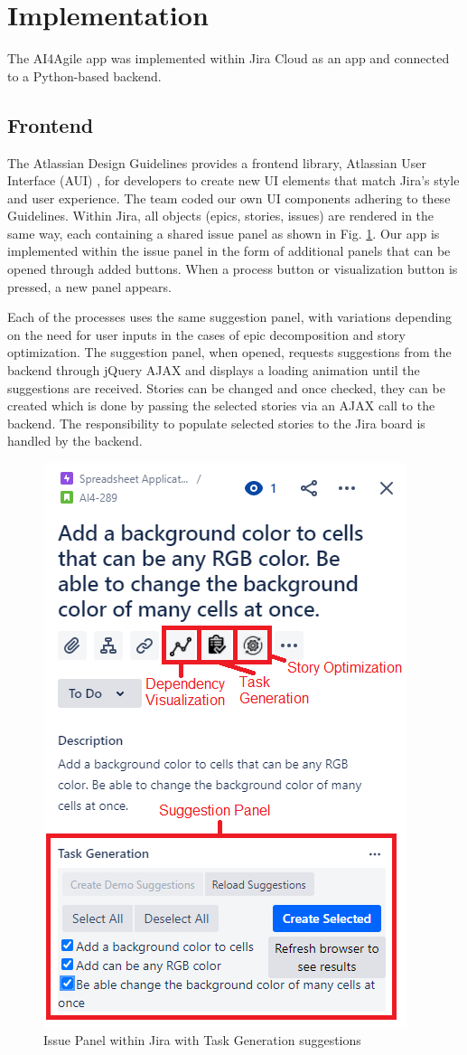 \section{Implementation}
\label{implementation}

The AI4Agile app was implemented within Jira Cloud as an app and connected to a Python-based backend.

\subsection{Frontend}
The Atlassian Design Guidelines \cite{jira3} provides a frontend library, Atlassian User Interface (AUI) \cite{jira4}, for developers to create new UI elements that match Jira’s style and user experience. The team coded our own UI components adhering to these Guidelines.
Within Jira, all objects (epics, stories, issues) are rendered in the same way, each containing a shared issue panel as shown in Fig. \ref{fig:issueView}. Our app is implemented within the issue panel in the form of additional panels that can be opened through added buttons. When a process button or visualization button is pressed, a new panel appears.

Each of the processes uses the same suggestion panel, with variations depending on the need for user inputs in the cases of epic decomposition and story optimization. The suggestion panel, when opened, requests suggestions from the backend through jQuery AJAX \cite{ajax} and displays a loading animation until the suggestions are received. Stories can be changed and once checked, they can be created which is done by passing the selected stories via an AJAX call to the backend. The responsibility to populate selected stories to the Jira board is handled by the backend.

\begin{figure}
\centering
\includegraphics[width=.5\textwidth,keepaspectratio]{./figure/Frontend.png}
\caption{Issue Panel within Jira with Task Generation suggestions }
\label{fig:issueView}
\end{figure}

